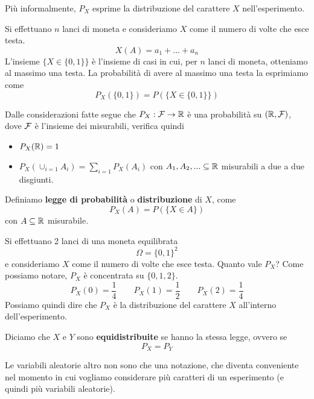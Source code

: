 Più informalmente, $P_X$ esprime la distribuzione del carattere $X$ nell'esperimento.

\begin{example}
	Si effettuano $n$ lanci di moneta e consideriamo $X$ come il numero di volte che esce testa.
	\[ X(A) = a_1 + \dots + a_n \]
	L'insieme $\{ X \in \{ 0, 1 \} \}$ è l'insieme di casi in cui, per $n$ lanci di moneta,
	otteniamo al massimo una testa. La probabilità di avere al massimo una testa
	la esprimiamo come
	\[ P_X (\{0,1\}) = P (\{X \in \{0,1\}\}) \]
\end{example}

\begin{proposition}
	Dalle considerazioni fatte segue che $P_X : \mathcal{F} \to \mathbb{R}$ è una probabilità su $(\mathbb{R}, \mathcal{F})$, dove
	$\mathcal{F}$ è l'insieme dei misurabili, verifica quindi
	\begin{itemize}
		\item $P_X (\mathbb{R}) = 1$
		\item $P_X(\cup_{i=1} A_i) = \sum_{i=1} P_X(A_i)$ con $A_1, A_2, ... \subseteq \mathbb{R}$
		      misurabili a due a due disgiunti.
	\end{itemize}
\end{proposition}

\begin{definition}
	Definiamo \textbf{legge di probabilità} o \textbf{distribuzione} di $X$, come
	\[ P_X (A) = P(\{ X \in A\}) \]
	con $A \subseteq \mathbb{R}$ misurabile.
\end{definition}

\begin{example}
	Si effettuano 2 lanci di una moneta equilibrata
	\[ \Omega = \{ 0, 1 \}^2 \]
	e consideriamo $X$ come il numero di volte che esce testa. Quanto vale $P_X$?
	Come possiamo notare, $P_X$ è concentrata su $\{ 0, 1, 2 \}$.
	\[
		P_X (0) = \frac{1}{4} \quad \quad
		P_X (1) = \frac{1}{2} \quad \quad
		P_X (2) = \frac{1}{4}
	\]
	Possiamo quindi dire che $P_X$ è la distribuzione del carattere $X$ all'interno
	dell'esperimento.
\end{example}

\begin{definition}
	Diciamo che $X$ e $Y$ sono \textbf{equidistribuite} se hanno la stessa legge, ovvero se
	\[ P_X = P_Y \]
\end{definition}

Le variabili aleatorie altro non sono che una notazione, che diventa conveniente nel momento in cui
vogliamo considerare più caratteri di un esperimento (e quindi più variabili aleatorie).

